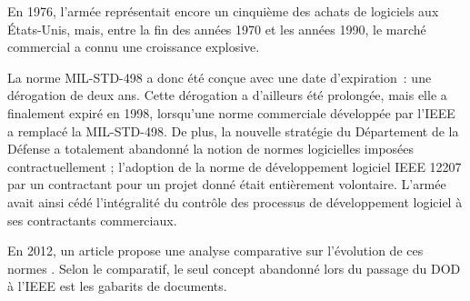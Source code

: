 {{\item [][---] En 1976, l'armée représentait encore un cinquième des achats de logiciels aux États-Unis, mais, entre la fin des années 1970 et les années 1990, le marché commercial a connu une croissance explosive.
\item [][---] La norme MIL-STD-498 a donc été conçue avec une date d'expiration~: une dérogation de deux ans. Cette dérogation a d'ailleurs été prolongée, mais elle a finalement expiré en 1998, lorsqu'une norme commerciale développée par l'IEEE a remplacé la MIL-STD-498. De plus, la nouvelle stratégie du Département de la Défense a totalement abandonné la notion de normes logicielles imposées contractuellement ; l'adoption de la norme de développement logiciel IEEE 12207 par un contractant pour un projet donné était entièrement volontaire. L'armée avait ainsi cédé l'intégralité du contrôle des processus de développement logiciel à ses contractants commerciaux.
}
{\cite{mcdonald_histo_2010}}

En 2012, un article propose une analyse comparative sur l'évolution de ces normes \cite{codur_dod_2012}. Selon le comparatif, le seul concept abandonné lors du passage du DOD à l’IEEE est les gabarits de documents. 

}
